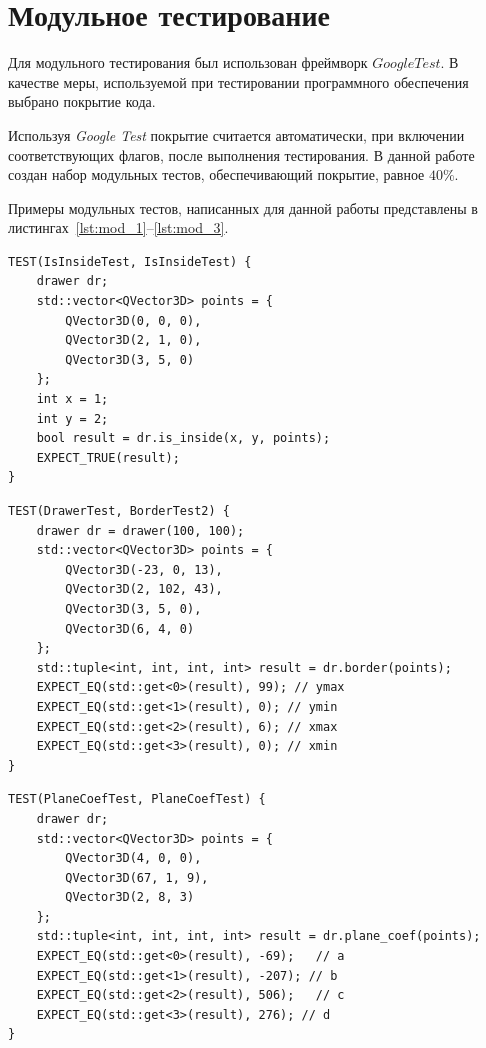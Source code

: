 \section{Модульное тестирование}

Для модульного тестирования был использован фреймворк \textit{$Google Test$}.
В качестве меры, используемой при тестировании программного обеспечения выбрано покрытие кода.

Используя \textit{Google Test} покрытие считается автоматически, при включении соответствующих флагов, после выполнения тестирования. В данной работе создан набор модульных тестов, обеспечивающий покрытие, равное $40\%$.

Примеры модульных тестов, написанных для данной работы представлены в листингах~\ref{lst:mod_1}--\ref{lst:mod_3}.
\clearpage
\begin{center}
	\captionsetup{justification=raggedright,singlelinecheck=off}
	\begin{lstlisting}[label=lst:mod_1,caption={Тест для функции, которая определяет принадлежность точки полигону}]
TEST(IsInsideTest, IsInsideTest) {
	drawer dr;
	std::vector<QVector3D> points = {
		QVector3D(0, 0, 0),
		QVector3D(2, 1, 0),
		QVector3D(3, 5, 0)
	};
	int x = 1;
	int y = 2;
	bool result = dr.is_inside(x, y, points);
	EXPECT_TRUE(result);
}
	\end{lstlisting}
\end{center}


\begin{center}
	\captionsetup{justification=raggedright,singlelinecheck=off}
	\begin{lstlisting}[label=lst:mod_2,caption={Тест для функции, которая определяет прямоугольник, в который вписан полигон}]
TEST(DrawerTest, BorderTest2) {
	drawer dr = drawer(100, 100);
	std::vector<QVector3D> points = {
		QVector3D(-23, 0, 13),
		QVector3D(2, 102, 43),
		QVector3D(3, 5, 0),
		QVector3D(6, 4, 0)
	};
	std::tuple<int, int, int, int> result = dr.border(points);
	EXPECT_EQ(std::get<0>(result), 99); // ymax
	EXPECT_EQ(std::get<1>(result), 0); // ymin
	EXPECT_EQ(std::get<2>(result), 6); // xmax
	EXPECT_EQ(std::get<3>(result), 0); // xmin
}
	\end{lstlisting}
\end{center}
\clearpage

\begin{center}
	\captionsetup{justification=raggedright,singlelinecheck=off}
	\begin{lstlisting}[label=lst:mod_3,caption={Тест для функции, которая вычисляет коэффициенты плоскости}]
TEST(PlaneCoefTest, PlaneCoefTest) {
	drawer dr;
	std::vector<QVector3D> points = {
		QVector3D(4, 0, 0),
		QVector3D(67, 1, 9),
		QVector3D(2, 8, 3)
	};
	std::tuple<int, int, int, int> result = dr.plane_coef(points);
	EXPECT_EQ(std::get<0>(result), -69);   // a
	EXPECT_EQ(std::get<1>(result), -207); // b
	EXPECT_EQ(std::get<2>(result), 506);   // c
	EXPECT_EQ(std::get<3>(result), 276); // d
}
	\end{lstlisting}
\end{center}


